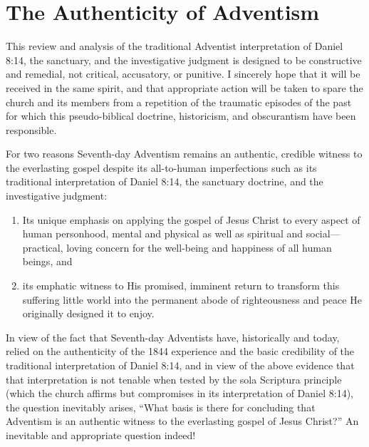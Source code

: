 \chapter{The Authenticity of Adventism}
\label{ch:authenticity}

This review and analysis of the traditional Adventist interpretation of
Daniel 8:14, the sanctuary, and the investigative judgment is designed to be
constructive and remedial, not critical, accusatory, or punitive. I
sincerely hope that it will be received in the same spirit, and that
appropriate action will be taken to spare the church and its members from a
repetition of the traumatic episodes of the past for which this
pseudo-biblical doctrine, historicism, and obscurantism have been
responsible.

For two reasons Seventh-day Adventism remains an authentic, credible witness
to the everlasting gospel despite its all-to-human imperfections such as its
traditional interpretation of Daniel 8:14, the sanctuary doctrine, and the
investigative judgment:
\begin{enumerate}
\item Its unique emphasis on applying the gospel of
Jesus Christ to every aspect of human personhood, mental and physical as
well as spiritual and social---practical, loving concern for the well-being
and happiness of all human beings, and 
\item its emphatic witness to His
promised, imminent return to transform this suffering little world into the
permanent abode of righteousness and peace He originally designed it to
enjoy.
\end{enumerate}

In view of the fact that Seventh-day Adventists have, historically and
today, relied on the authenticity of the 1844 experience and the basic
credibility of the traditional interpretation of Daniel 8:14, and in view of
the above evidence that that interpretation is not tenable when tested by
the sola Scriptura principle (which the church affirms but compromises in
its interpretation of Daniel 8:14), the question inevitably arises, ``What
basis is there for concluding that Adventism is an authentic witness to the
everlasting gospel of Jesus Christ?'' An inevitable and appropriate question
indeed!

